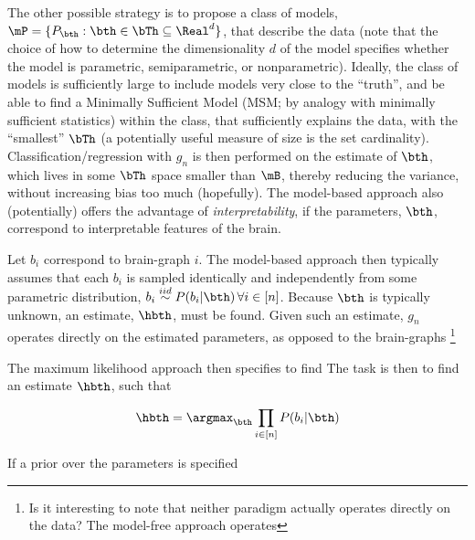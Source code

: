 The other possible strategy is to propose a class of models, $\mP=\{P_{\bth} : \bth \in \bTh \subseteq \Real^d\}$, that describe the data (note that the choice of how to determine the dimensionality $d$ of the model specifies whether the model is parametric, semiparametric, or nonparametric).  Ideally, the class of models is sufficiently large to include models very close to the ``truth'', and be able to find a Minimally Sufficient Model (MSM; by analogy with minimally sufficient statistics) within the class, that sufficiently explains the data, with the ``smallest'' $\bTh$ (a potentially useful measure of size is the set cardinality).  
Classification/regression with $g_n$ is then performed on the estimate of $\bth$, which lives in some $\bTh$ space smaller than $\mB$, thereby reducing the variance, without increasing bias too much (hopefully).  The model-based approach also (potentially) offers the advantage of \emph{interpretability}, if the parameters, $\bth$, correspond to interpretable features of the brain.  

Let $b_i$ correspond to brain-graph $i$.  The model-based approach then typically assumes that each $b_i$ is sampled identically and independently from some parametric distribution, $b_i \overset{iid}{\sim} P(b_i | \bth) \, \forall i \in [n]$. Because $\bth$ is typically unknown, an estimate, $\hbth$, must be found.  Given such an estimate, $g_n$ operates directly on the estimated parameters, as opposed to the brain-graphs \footnote{Is it interesting to note that neither paradigm actually operates directly on the data?  The model-free approach operates}

The maximum likelihood approach then specifies to find The task is then to find an estimate $\hbth$, such that

\begin{align}
	\hbth = \argmax_{\bth} \prod_{i\in [n]} P(b_i | \bth)
\end{align}

If a prior over the parameters is specified

